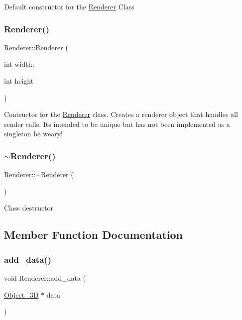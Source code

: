 Default constructor for the \mbox{\hyperlink{classRenderer}{Renderer}} Class \mbox{\label{classRenderer_af72dee9cedcc9e481dd3d313bac11b62}} 
\subsubsection{\texorpdfstring{Renderer()}{Renderer()}\hspace{0.1cm}{\footnotesize\ttfamily [2/2]}}
{\footnotesize\ttfamily Renderer\+::\+Renderer (\begin{DoxyParamCaption}\item[{int}]{width,  }\item[{int}]{height }\end{DoxyParamCaption})}

Contructor for the \mbox{\hyperlink{classRenderer}{Renderer}} class. Creates a renderer object that handles all render calls. It\textquotesingle{}s intended to be unique but has not been implemented as a singleton be weary! \mbox{\label{classRenderer_afeee408862d5bd6255a6882d47e6d5cd}} 
\subsubsection{\texorpdfstring{$\sim$\+Renderer()}{~Renderer()}}
{\footnotesize\ttfamily Renderer\+::$\sim$\+Renderer (\begin{DoxyParamCaption}{ }\end{DoxyParamCaption})}

Class destructor 

\subsection{Member Function Documentation}
\mbox{\label{classRenderer_acdc6907bf1aaf90fe7e11e29f3b6de20}} 
\subsubsection{\texorpdfstring{add\+\_\+data()}{add\_data()}}
{\footnotesize\ttfamily void Renderer\+::add\+\_\+data (\begin{DoxyParamCaption}\item[{\mbox{\hyperlink{classObject__3D}{Object\+\_\+3D}} $\ast$}]{data }\end{DoxyParamCaption})}

